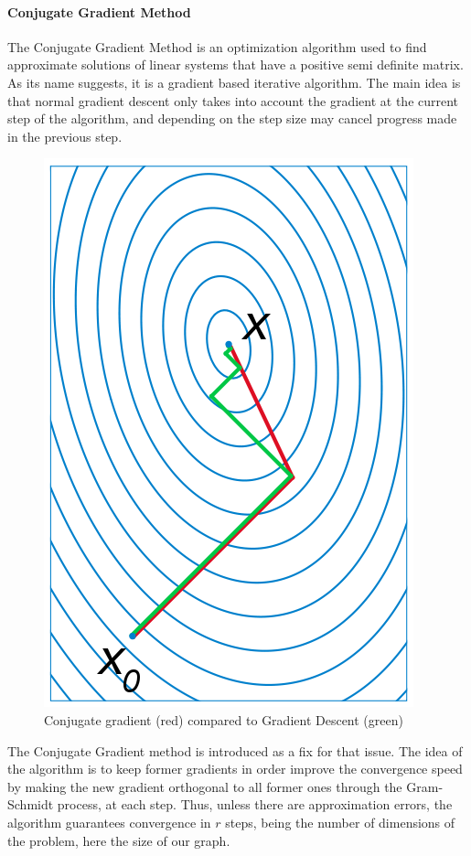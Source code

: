 \documentclass{article}
\theoremstyle{definition}
\begin{document}
\paragraph{Conjugate Gradient Method}
The Conjugate Gradient Method\cite{nesterov_lectures_2018} is an optimization algorithm used to find approximate solutions of linear systems that have a positive semi definite matrix. As its name suggests, it is a gradient based iterative algorithm. The main idea is that normal gradient descent only takes into account the gradient at the current step of the algorithm, and depending on the step size may cancel progress made in the previous step.
\begin{figure}[!htb]
	\centering
	\includegraphics[height=0.3\textheight]{data/sota/conj_grad.png}
	\caption{Conjugate gradient (red) compared to Gradient Descent (green)}
	\label{fig:conj_grad}
\end{figure} 
The Conjugate Gradient method is introduced as a fix for that issue. The idea of the algorithm is to keep former gradients in order improve the convergence speed by making the new gradient orthogonal to all former ones through the Gram-Schmidt process, at each step. Thus, unless there are approximation errors, the algorithm guarantees convergence in $r$ steps, being the number of dimensions of the problem, here the size of our graph.\\
\end{document}
